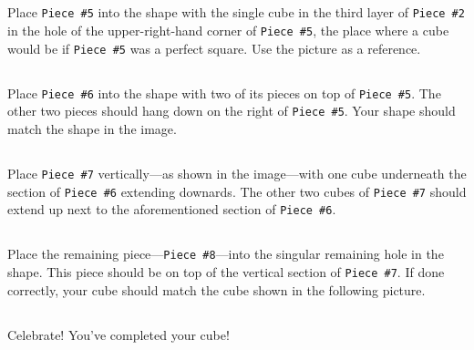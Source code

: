 \documentclass[11pt, twoside]{article}
\begin{document}
      \begin{center}
      \end{center}

    \subsection{}
      Place \texttt{Piece \#5} into the shape with the single cube in the third layer of \texttt{Piece \#2}
        in the hole of the upper-right-hand corner of \texttt{Piece \#5}, the place where a cube would be if
        \texttt{Piece \#5} was a perfect square. Use the picture as a reference.

      \begin{center}
      \end{center}

    \subsection{}
      Place \texttt{Piece \#6} into the shape with two of its pieces on top of \texttt{Piece \#5}. The other
        two pieces should hang down on the right of \texttt{Piece \#5}. Your shape should match the shape in
        the image.

        \begin{center}
        \end{center}

    \clearpage
    \subsection{}
      Place \texttt{Piece \#7} vertically---as shown in the image---with one cube underneath the section of
        \texttt{Piece \#6} extending downards. The other two cubes of \texttt{Piece \#7} should extend up next
        to the aforementioned section of \texttt{Piece \#6}.

      \begin{center}
      \end{center}

    \subsection{}
      Place the remaining piece---\texttt{Piece \#8}---into the singular remaining hole in the shape. This
        piece should be on top of the vertical section of \texttt{Piece \#7}. If done correctly, your cube
        should match the cube shown in the following picture.

      \begin{center}
      \end{center}

    \subsection{}
      Celebrate! You've completed your cube!

      \begin{center}
      \end{center}
\end{document}
